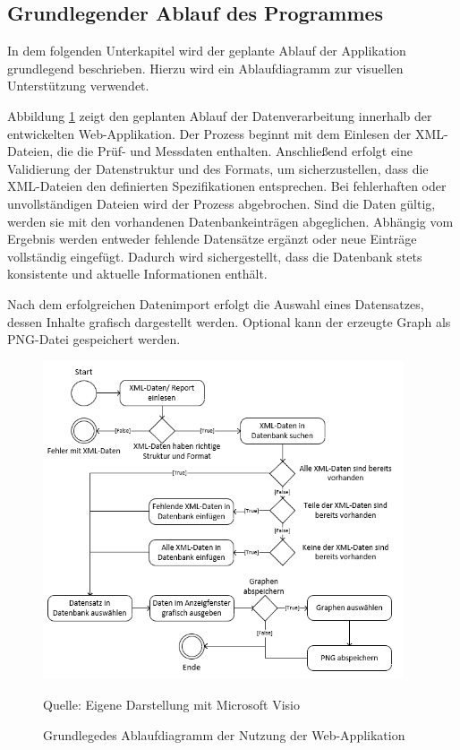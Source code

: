 \subsection{Grundlegender Ablauf des Programmes}
\label{subsec:grundlegender-ablauf-des-programmes}

In dem folgenden Unterkapitel wird der geplante Ablauf der Applikation grundlegend beschrieben.
Hierzu wird ein Ablaufdiagramm zur visuellen Unterstützung verwendet.

Abbildung \ref{fig: Grundlegedes Ablaufdiagramm der Nutzung der Web-Applikation} zeigt den geplanten Ablauf der Datenverarbeitung innerhalb der entwickelten Web-Applikation.
Der Prozess beginnt mit dem Einlesen der XML-Dateien, die die Prüf- und Messdaten enthalten.
Anschließend erfolgt eine Validierung der Datenstruktur und des Formats, um sicherzustellen, dass die XML-Dateien den definierten Spezifikationen entsprechen.
Bei fehlerhaften oder unvollständigen Dateien wird der Prozess abgebrochen.
Sind die Daten gültig, werden sie mit den vorhandenen Datenbankeinträgen abgeglichen.
Abhängig vom Ergebnis werden entweder fehlende Datensätze ergänzt oder neue Einträge vollständig eingefügt.
Dadurch wird sichergestellt, dass die Datenbank stets konsistente und aktuelle Informationen enthält.

Nach dem erfolgreichen Datenimport erfolgt die Auswahl eines Datensatzes, dessen Inhalte grafisch dargestellt werden.
Optional kann der erzeugte Graph als PNG-Datei gespeichert werden.



\begin{figure}[H]
    \centering
    \includegraphics[width=0.95\textwidth]{Grafiken/Ablaufdiagramm}
    \caption{Grundlegedes Ablaufdiagramm der Nutzung der Web-Applikation}
    \label{fig: Grundlegedes Ablaufdiagramm der Nutzung der Web-Applikation}
    {Quelle: Eigene Darstellung mit Microsoft Visio}
\end{figure}